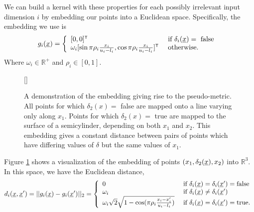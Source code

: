 \documentclass{article}
\newcommand{\vect}[1]{\underline{\smash{#1}}}
\renewcommand{\v}[1]{\vect{#1}}
\newcommand{\reals}{\mathds{R}}
\newcommand{\sX}{\mathcal{X}}
\newcommand{\br}{}%
\newcommand\transpose{{\textrm{\tiny{\sf{T}}}}}
\newcommand{\embeddingletter}{g}
\begin{document}
We can build a kernel with these properties for each possibly irrelevant input dimension $i$ by embedding our points into a Euclidean space.  Specifically, the embedding we use is
%
%
%
\begin{equation}
\embeddingletter_i\br(\v{x}) = \left\{\begin{array}{ll}
[0,0]^\transpose & \textrm{ if } \delta_i(\v{x}) = \textrm{ false }\\
\omega_i [\sin{\pi\rho_i\frac{x_i}{u_i-l_i}}, \cos{\pi\rho_i\frac{x_i}{u_i-l_i}}]^\transpose & \textrm{ otherwise.}\end{array}\right.
\label{eq:embedding}
\end{equation}
Where $\omega_i \in \mathbb{R}^+$ and $\rho_i \in [0,1]$.
%
\begin{figure}
	[\FBwidth]
	{\caption{A demonstration of the embedding giving rise to the pseudo-metric.  All points for which $\delta_2(x) =$ false are mapped onto a line varying only along $x_1$.  Points for which $\delta_2(x) =$ true are mapped to the surface of a semicylinder, depending on both $x_1$ and $x_2$.  This embedding gives a constant distance between pairs of points which have differing values of $\delta$ but the same values of $x_1$.}}
	{\hspace{-1cm}\label{fig:cylinder}}
\vspace{-0.3cm}
\end{figure}

Figure \ref{fig:cylinder} shows a visualization of the embedding of points $(x_1, \delta_2(\v{x}), x_2)$ into $\reals^3$. 
%
In this space, we have the Euclidean distance,
%
\begin{equation}
d\br_i(\v{x}, \v{x}') = ||\embeddingletter_i\br(\v{x})-\embeddingletter_i\br(\v{x}')||_2 =\left\{\begin{array}{ll}
0 & \textrm{ if } \delta_i(\v{x}) = \delta_i(\v{x}') = \textrm{false}\\
\omega_i & \textrm{ if } \delta_i(\v{x}) \neq \delta_i(\v{x}')\\
\omega_i \sqrt{2} \sqrt{1 - \cos(\pi\rho_i \frac{x_i-x_i'}{u_i-l_i})} & \textrm{ if } \delta_i(\v{x}) = \delta_i(\v{x}') = \textrm{true}. \end{array}\right.
\label{eq:distance}
\end{equation}
\end{document}
